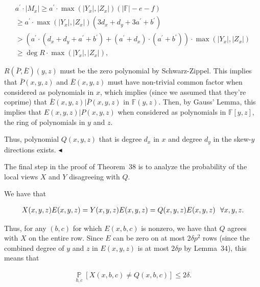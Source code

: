 \documentclass[10pt,a4paper]{article}
\begin{document}
\[\begin{gathered}
\displaystyle a^{\prime}\cdot|M_{x}| \displaystyle\geq a^{\prime}\cdot\max(|Y_{x}|,|Z_{x}|)(|\mathbb{F}|-e-f) \\
\displaystyle\geq a^{\prime}\cdot\max(|Y_{x}|,|Z_{x}|)(3d_{x}+d_{y}+3a^{\prime}+b^{\prime}) \\
\displaystyle>\left(a^{\prime}\cdot(d_{x}+d_{y}+a^{\prime}+b^{\prime})+(a^{\prime}+d_{x})\cdot(a^{\prime}+b^{\prime})\right)\cdot\max(|Y_{x}|,|Z_{x}|) \\
\displaystyle\geq\deg R\cdot\max(|Y_{x}|,|Z_{x}|),
\end{gathered}\]


$R(\bar{P},\bar{E})(y,z)$ must be the zero polynomial by Schwarz-Zippel. This implies that $\bar{P}(x,y,z)$ and $\bar{E}(x,y,z)$ must have non-trivial common factor when considered as polynomials in $x$, which implies (since we assumed that they’re coprime) that $\bar{E}(x,y,z)|\bar{P}(x,y,z)$ in $\mathbb{F}(y,z)$. Then, by Gauss’ Lemma, this implies that $E(x,y,z)|P(x,y,z)$ when considered as polynomials in $\mathbb{F}[y,z]$, the ring of polynomials in $y$ and $z$.\par




Thus, polynomial $Q(x,y,z)$ that is degree $d_{x}$ in $x$ and degree $d_{y}$ in the skew-$y$ directions exists.
$\blacktriangleleft$\par




The final step in the proof of Theorem 38 is to analyze the probability of the local views $X$ and $Y$ disagreeing with $Q$.\par




We have that\par


\[\begin{gathered}
X(x,y,z)E(x,y,z)=Y(x,y,z)E(x,y,z)=Q(x,y,z)E(x,y,z)\nobreak\ \nobreak\ \forall x,y,z.
\end{gathered}\]


Thus, for any $(b,c)$ for which $E(x,b,c)$ is nonzero, we have that $Q$ agrees with $X$ on the entire row. Since $E$ can be zero on at most $2\delta p^{2}$ rows (since the combined degree of $y$ and $z$ in $E(x,y,z)$ is at most $2\delta p$ by Lemma 34), this means that\par


\[\begin{gathered}
\operatorname*{\mathbb{P}}_{b,c}[X(x,b,c)\not=Q(x,b,c)]\leq 2\delta.
\end{gathered}\]
\end{document}
